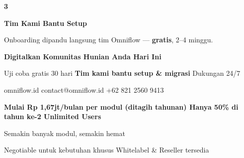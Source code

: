 \documentclass[a4paper]{article}
\begin{document}
\begin{center}
\begin{minipage}[t]{0.318\textwidth}
{\begin{minipage}[t][4.7cm][c]{\dimexpr\linewidth-2\fboxsep\relax}
            \begin{center}{\fontsize{22}{26}\selectfont\bfseries\color{BluePrimary} 3}\end{center}
            \vspace{2pt}
            \begin{center}
                {\fontsize{10}{13}\selectfont\bfseries\color{BlueDark} Tim Kami Bantu Setup}\par\vspace{3pt}
                {\fontsize{9}{12}\selectfont\color{TextDark} Onboarding dipandu langsung tim Omniflow --- \textbf{gratis}, 2--4 minggu.}
            \end{center}
        \end{minipage}}
\end{minipage}
\end{center}

\vspace{8pt}

{\setlength{\fboxsep}{10pt}\setlength{\fboxrule}{0pt}%
\noindent\colorbox{BluePrimary}{%
    \begin{minipage}{\dimexpr\textwidth-2\fboxsep\relax}
        \centering
        {\fontsize{13}{16}\selectfont\bfseries\color{White} Digitalkan Komunitas Hunian Anda Hari Ini}\par\vspace{3pt}
        {\fontsize{9.5}{12}\selectfont\color{BlueMid} Uji coba gratis 30 hari \enspace\textbullet\enspace \textbf{Tim kami bantu setup \& migrasi} \enspace\textbullet\enspace Dukungan 24/7}\par\vspace{2pt}
        {\fontsize{9.5}{12}\selectfont\color{BlueLight} omniflow.id \enspace\textbullet\enspace contact@omniflow.id \enspace\textbullet\enspace +62 821 2560 9413}
    \end{minipage}}}


\vspace{6pt}

{\setlength{\fboxsep}{8pt}\setlength{\fboxrule}{0pt}%
\noindent\colorbox{BlueBg}{%
    \begin{minipage}{\dimexpr\textwidth-2\fboxsep\relax}
        \centering
        {\fontsize{9}{12}\selectfont\bfseries\color{BluePrimary}
        Mulai Rp 1,67jt/bulan per modul (ditagih tahunan) \enspace\textbullet\enspace Hanya 50\% di tahun ke-2 \enspace\textbullet\enspace Unlimited Users}\par\vspace{1pt}
        {\fontsize{8.5}{11}\selectfont\color{BlueDark}
        Semakin banyak modul, semakin hemat}\par\vspace{1pt}
        {\fontsize{8}{10}\selectfont\color{TextLight}
        Negotiable untuk kebutuhan khusus \enspace\textbullet\enspace Whitelabel \& Reseller tersedia}
    \end{minipage}}}

\restoregeometry
\pagestyle{empty}
\end{document}
